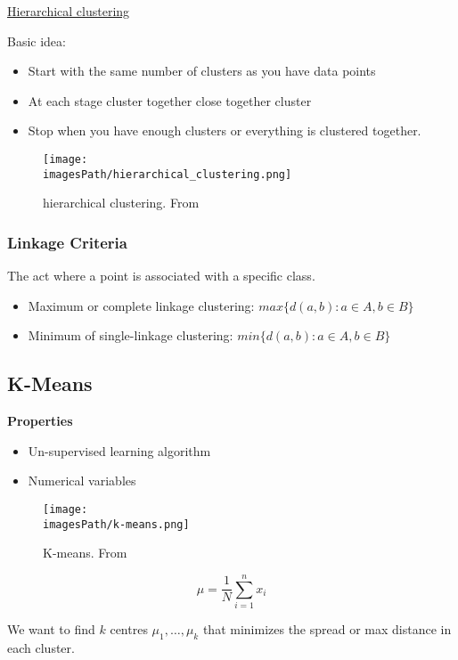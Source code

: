\begin{multicols}{2}
\href{https://www.youtube.com/watch?v=7xHsRkOdVwo}{Hierarchical clustering}

Basic idea:
\begin{itemize}
    \item Start with the same number of clusters as you have data points
    \item At each stage cluster together close together cluster 
    \item Stop when you have enough clusters or everything is clustered together.
\end{itemize}

\begin{figure}[H]
    \centering
    \texttt{[image: \\imagesPath/hierarchical\_clustering.png]}
    \caption{hierarchical clustering. From \cite{iml}}
\end{figure}

\subsubsection{Linkage Criteria}
The act where a point is associated with a specific class.
\begin{itemize}
    \item Maximum or complete linkage clustering:
    $max\{ d(a,b): a\in A, b\in B\}$
    \item Minimum of single-linkage clustering:
    $min\{ d(a,b): a\in A, b\in B\}$
\end{itemize}

\subsection{K-Means}
\textbf{Properties}
\begin{itemize}
    \item Un-supervised learning algorithm
    \item Numerical variables 
\end{itemize}
\begin{figure}[H]
    \centering
    \texttt{[image: \\imagesPath/k-means.png]}
    \caption{K-means. From \cite{iml}}
\end{figure}

\begin{equation*}
    \mu = \frac{1}{N} \sum_{i=1}^{n} x_i
\end{equation*}

We want to find $k$ centres $\mu_1,\ldots,\mu_k$ that minimizes the spread or max 
distance in each cluster. 


\end{multicols}
